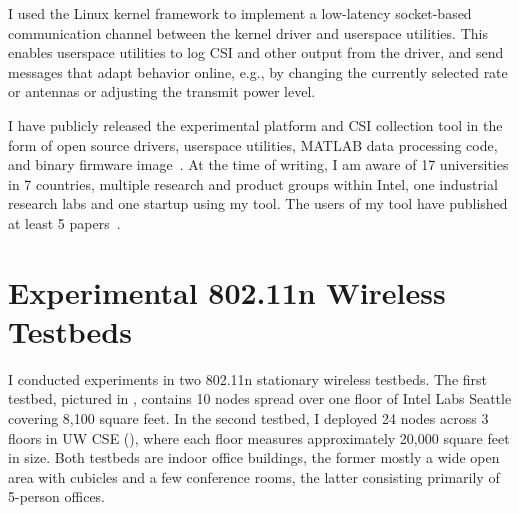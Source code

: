  I used the Linux kernel  framework to implement a low-latency socket-based communication channel between the kernel driver and userspace utilities. This enables userspace utilities to log CSI and other output from the driver, and send messages that adapt behavior online, e.g., by changing the currently selected rate or antennas or adjusting the transmit power level.

 I have publicly released the experimental platform and CSI collection tool in the form of open source drivers, userspace utilities, MATLAB data processing code, and binary firmware image~\cite{Halperin_csitool}. At the time of writing, I am aware of 17 universities in 7 countries, multiple research and product groups within Intel, one industrial research labs and one startup using my tool. The users of my tool have published at least 5 papers~\cite{Bhartia_FreqDiv,Crepaldi_CSI_SF,Perahia_Doppler,Sen_SpinLoc,Sen_PinLoc}.

\section{Experimental 802.11n Wireless Testbeds}
I conducted experiments in two 802.11n stationary wireless testbeds. The first testbed, pictured in , contains 10 nodes spread over one floor of Intel Labs Seattle covering 8,100 square feet. In the second testbed, I deployed 24 nodes across 3 floors in UW CSE (), where each floor measures approximately 20,000 square feet in size. Both testbeds are indoor office buildings, the former mostly a wide open area with cubicles and a few conference rooms, the latter consisting primarily of 5-person offices.

